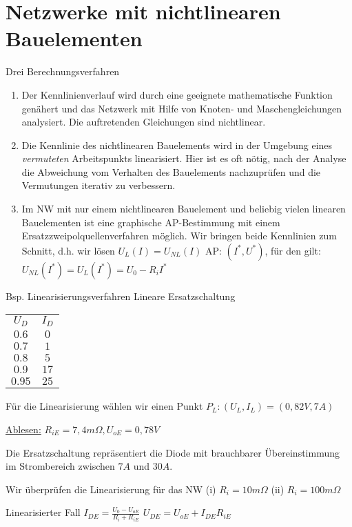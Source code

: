 \documentclass[german]{article}
\newcommand{\ohm}{\Omega}
\begin{document}

\section{Netzwerke mit nichtlinearen Bauelementen}

Drei Berechnungsverfahren
\begin{enumerate}
	\item Der Kennlinienverlauf wird durch eine geeignete mathematische Funktion genähert und das Netzwerk mit Hilfe von Knoten- und Maschengleichungen analysiert.
		Die auftretenden Gleichungen sind nichtlinear.
	\item Die Kennlinie des nichtlinearen Bauelements wird in der Umgebung eines {\it vermuteten} Arbeitspunkts linearisiert. Hier ist es oft nötig, nach der Analyse die Abweichung vom Verhalten des Bauelements nachzuprüfen und die Vermutungen iterativ zu verbessern.
	\item Im NW mit nur einem nichtlinearen Bauelement und beliebig vielen linearen Bauelementen ist eine graphische AP-Bestimmung mit einem Ersatzzweipolquellenverfahren möglich.
		Wir bringen beide Kennlinien zum Schnitt, d.h. wir lösen $U_L(I) = U_{NL}(I)$
		{\color{yellow} AP: $(I^*, U^*)$, für den gilt: $U_{NL}(I^*) = U_L(I^*) = U_0 - R_i I^*$}
\end{enumerate}

Bsp. Linearisierungsverfahren
Lineare Ersatzschaltung

\begin{tabular}{cc}
	$U_D$ & $I_D$ \\
	$0.6$ & $0$ \\
	$0.7$ & $1$ \\
	$0.8$ & $5$ \\
	$0.9$ & $17$ \\
	$0.95$ & $25$
\end{tabular}

Für die Linearisierung wählen wir einen Punkt $P_L: (U_L, I_L) = (0,82V, 7A)$

\underline{Ablesen:} $R_{iE} = 7,4m\ohm, U_{oE} = 0,78V$

Die Ersatzschaltung repräsentiert die Diode mit brauchbarer Übereinstimmung im Strombereich zwischen $7A$ und $30A$.

Wir überprüfen die Linearisierung für das NW
(i) $R_i = 10m\ohm$ (ii) $R_i = 100m\ohm$

Linearisierter Fall
$I_{DE} = \frac{U_0 - U_{oE}}{R_i + R_{iE}}$
$U_{DE} = U_{oE} + I_{DE} R_{iE}$
\end{document}
